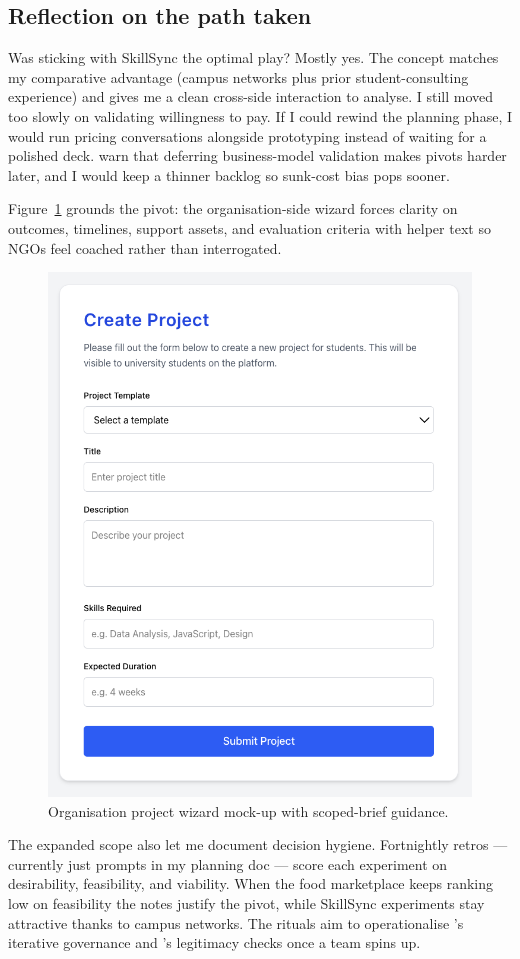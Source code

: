 \subsection*{Reflection on the path taken}
Was sticking with SkillSync the optimal play? Mostly yes. The concept matches my comparative advantage (campus networks plus prior student-consulting experience) and gives me a clean cross-side interaction to analyse. I still moved too slowly on validating willingness to pay. If I could rewind the planning phase, I would run pricing conversations alongside prototyping instead of waiting for a polished deck. \citet{HagiuWright2013} warn that deferring business-model validation makes pivots harder later, and I would keep a thinner backlog so sunk-cost bias pops sooner.

Figure~\ref{fig:project-creation} grounds the pivot: the organisation-side wizard forces clarity on outcomes, timelines, support assets, and evaluation criteria with helper text so NGOs feel coached rather than interrogated.

\begin{figure}[H]
  \centering
  \includegraphics[width=0.85\linewidth]{figures/Organisation-generate-project.png}
  \caption{Organisation project wizard mock-up with scoped-brief guidance.}
  \label{fig:project-creation}
\end{figure}

The expanded scope also let me document decision hygiene. Fortnightly retros --- currently just prompts in my planning doc --- score each experiment on desirability, feasibility, and viability. When the food marketplace keeps ranking low on feasibility the notes justify the pivot, while SkillSync experiments stay attractive thanks to campus networks. The rituals aim to operationalise \citet{Choudary2016}'s iterative governance and \citet{Srnicek2017}'s legitimacy checks once a team spins up.
